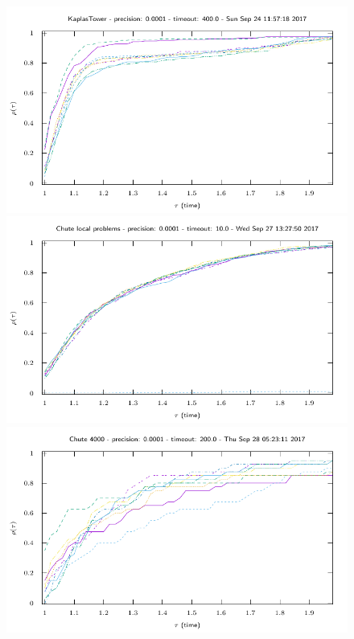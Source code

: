 \begin{figure}
\includegraphics[width=\figwidth]{../figure/NSGS/LocalTol/1.0e-04/400/time/profile-KaplasTower.pdf} 
\includegraphics[width=\figwidth]{../figure/NSGS/LocalTol/1.0e-04/10/time/profile-Chute_local_problems.pdf} 
\includegraphics[width=\figwidth]{../figure/NSGS/LocalTol/1.0e-04/200/time/profile-Chute_4000.pdf} 

\end{figure}
